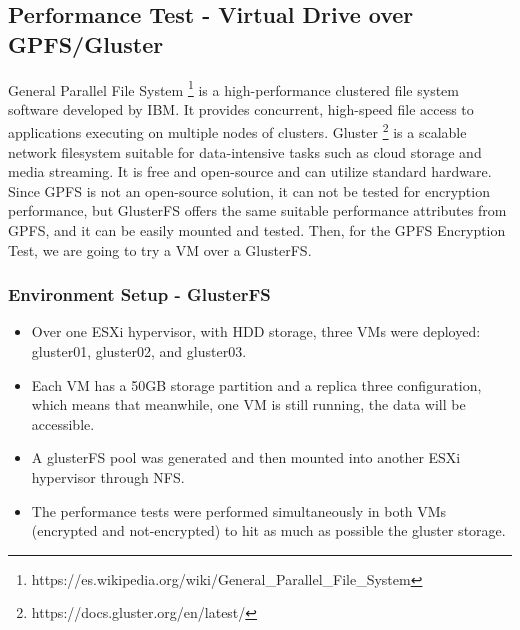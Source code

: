 \subsection{Performance Test - Virtual Drive over GPFS/Gluster}
General Parallel File System \footnote[1]{https://es.wikipedia.org/wiki/General\_Parallel\_File\_System} is a high-performance clustered file system software developed by IBM. It provides concurrent, high-speed file access to applications executing on multiple nodes of clusters.
Gluster \footnote[2]{https://docs.gluster.org/en/latest/} is a scalable network filesystem suitable for data-intensive tasks such as cloud storage and media streaming. It is free and open-source and can utilize standard hardware. 
Since GPFS is not an open-source solution, it can not be tested for encryption performance, but GlusterFS offers the same suitable performance attributes from GPFS, and it can be easily mounted and tested. Then, for the GPFS Encryption Test, we are going to try a VM over a GlusterFS.

\subsubsection{Environment Setup - GlusterFS}
\begin{itemize}
  \item Over one ESXi hypervisor, with HDD storage, three VMs were deployed: gluster01, gluster02, and gluster03.
  \item Each VM has a 50GB storage partition and a replica three configuration, which means that meanwhile, one VM is still running, the data will be accessible. 
  \item A glusterFS pool was generated and then mounted into another ESXi hypervisor through NFS.
  \item The performance tests were performed simultaneously in both VMs (encrypted and not-encrypted) to hit as much as possible the gluster storage.
\end{itemize}
\newpage
